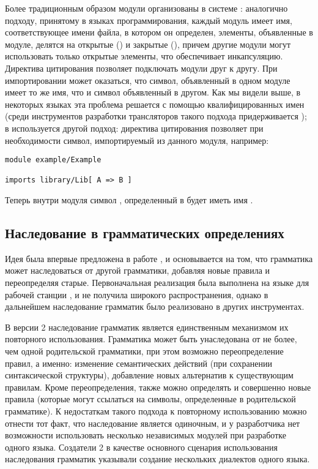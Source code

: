 Более традиционным образом модули организованы в системе  \cite{???}: аналогично подходу, принятому в языках программирования, каждый модуль имеет имя, соответствующее имени файла, в котором он определен, элементы, объявленные в модуле, делятся на открытые () и закрытые (), причем другие модули могут использовать только открытые элементы, что обеспечивает инкапсуляцию. Директива цитирования  позволяет подключать модули друг к другу. При импортировании может оказаться, что символ, объявленный в одном модуле имеет то же имя, что и символ объявленный в другом. Как мы видели выше, в некоторых языках эта проблема решается с помощью квалифицированных имен (среди инструментов разработки трансляторов такого подхода придерживается  \cite{???}); в  используется другой подход: директива цитирования позволяет при необходимости  символ, импортируемый из данного модуля, например:

\begin{lstlisting}
module example/Example

imports library/Lib[ A => B ]
\end{lstlisting}

Теперь внутри модуля  символ , определенный в  будет иметь имя .

\subsection{Наследование в грамматических определениях}
Идея  была впервые предложена в работе \cite{???}, и основывается на том, что грамматика может наследоваться от другой грамматики, добавляя новые правила и переопределяя старые. Первоначальная реализация была выполнена на языке  для рабочей станции , и не получила широкого распространения, однако в дальнейшем наследование грамматик было реализовано в других инструментах.

В  версии 2 \cite{???} наследование грамматик является единственным механизмом их повторного использования. Грамматика может быть унаследована от не более, чем одной родительской грамматики, при этом возможно переопределение правил, а именно: изменение семантических действий (при сохранении синтаксической структуры),  добавление новых альтернатив к существующим правилам. Кроме переопределения, также можно определять и совершенно новые правила (которые могут ссылаться на символы, определенные в родительской грамматике). К недостаткам такого подхода к повторному использованию можно отнести тот факт, что наследование является одиночным, и у разработчика нет возможности использовать несколько независимых модулей при разработке одного языка. Создатели  2 в качестве основного сценария использования наследования грамматик указывали создание нескольких диалектов одного языка\cite{???}.

